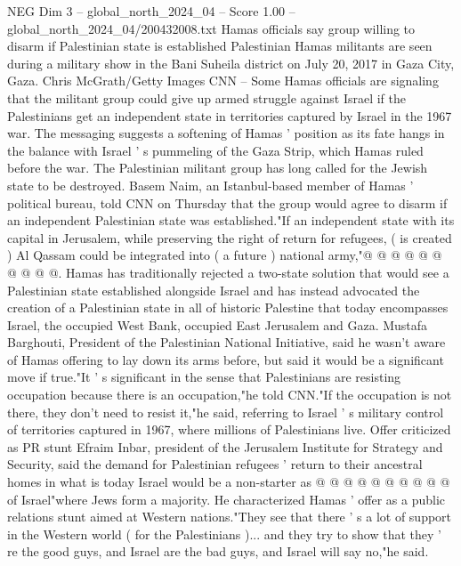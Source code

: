 \begin{textsample}{NEG Dim 3 – global\_north\_2024\_04 – Score 1.00 – global\_north\_2024\_04/200432008.txt}  \label{ex:f3_neg_405}
Hamas officials say group willing to disarm if Palestinian state is established Palestinian Hamas militants are seen during a military show in the Bani Suheila district on July 20, 2017 in Gaza City, Gaza.
Chris McGrath/Getty Images CNN -- Some Hamas officials are signaling that the militant group could give up armed struggle against Israel if the Palestinians get an independent state in territories captured by Israel in the 1967 war.
The messaging suggests a softening of Hamas ' position as its fate hangs in the balance with Israel ' s pummeling of the Gaza Strip, which Hamas ruled before the war.
The Palestinian militant group has long called for the Jewish state to be destroyed.
Basem Naim, an Istanbul-based member of Hamas ' political bureau, told CNN on Thursday that the group would agree to disarm if an independent Palestinian state was established."If an independent state with its capital in Jerusalem, while preserving the right of return for refugees, ( is created ) Al Qassam could be integrated into ( a future ) national army,"@ @ @ @ @ @ @ @ @ @.
Hamas has traditionally rejected a two-state solution that would see a Palestinian state established alongside Israel and has instead advocated the creation of a Palestinian state in all of historic Palestine that today encompasses Israel, the occupied West Bank, occupied East Jerusalem and Gaza.
Mustafa Barghouti, President of the Palestinian National Initiative, said he wasn't aware of Hamas offering to lay down its arms before, but said it would be a significant move if true."It ' s significant in the sense that Palestinians are resisting occupation because there is an occupation,"he told CNN."If the occupation is not there, they don't need to resist it,"he said, referring to Israel ' s military control of territories captured in 1967, where millions of Palestinians live.
Offer criticized as PR stunt Efraim Inbar, president of the Jerusalem Institute for Strategy and Security, said the demand for Palestinian refugees ' return to their ancestral homes in what is today Israel would be a non-starter as @ @ @ @ @ @ @ @ @ @ of Israel"where Jews form a majority.
He characterized Hamas ' offer as a public relations stunt aimed at Western nations."They see that there ' s a lot of support in the Western world ( for the Palestinians )... and they try to show that they ' re the good guys, and Israel are the bad guys, and Israel will say no,"he said.

\end{textsample}

